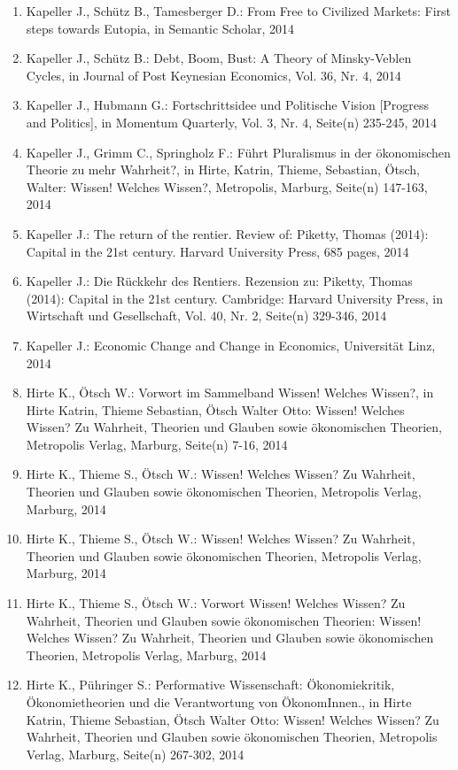 \begin{enumerate}
	 \item Kapeller J., Schütz B., Tamesberger D.: From Free to Civilized Markets: First steps towards Eutopia, in Semantic Scholar, 2014
	 \item Kapeller J., Schütz B.: Debt, Boom, Bust: A Theory of Minsky-Veblen Cycles, in Journal of Post Keynesian Economics, Vol. 36, Nr. 4, 2014
	 \item Kapeller J., Hubmann G.: Fortschrittsidee und Politische Vision [Progress and Politics], in Momentum Quarterly, Vol. 3, Nr. 4, Seite(n) 235-245, 2014
	 \item Kapeller J., Grimm C., Springholz F.: Führt Pluralismus in der ökonomischen Theorie zu mehr Wahrheit?, in Hirte, Katrin, Thieme, Sebastian, Ötsch, Walter: Wissen! Welches Wissen?, Metropolis, Marburg, Seite(n) 147-163, 2014
	 \item Kapeller J.: The return of the rentier. Review of: Piketty, Thomas (2014): Capital in the 21st century. Harvard University Press, 685 pages, 2014
	 \item Kapeller J.: Die Rückkehr des Rentiers. Rezension zu: Piketty, Thomas (2014): Capital in the 21st century. Cambridge: Harvard University Press, in Wirtschaft und Gesellschaft, Vol. 40, Nr. 2, Seite(n) 329-346, 2014
	 \item Kapeller J.: Economic Change and Change in Economics, Universität Linz, 2014
	 \item Hirte K., Ötsch W.: Vorwort im Sammelband \glqq Wissen! Welches Wissen?\grqq{}, in Hirte Katrin, Thieme Sebastian, Ötsch Walter Otto: Wissen! Welches Wissen? Zu Wahrheit, Theorien und Glauben sowie ökonomischen Theorien, Metropolis Verlag, Marburg, Seite(n) 7-16, 2014
	 \item Hirte K., Thieme S., Ötsch W.: Wissen! Welches Wissen? Zu Wahrheit, Theorien und Glauben sowie ökonomischen Theorien, Metropolis Verlag, Marburg, 2014
	 \item Hirte K., Thieme S., Ötsch W.: Wissen! Welches Wissen? Zu Wahrheit, Theorien und Glauben sowie ökonomischen Theorien, Metropolis Verlag, Marburg, 2014
	 \item Hirte K., Thieme S., Ötsch W.: Vorwort Wissen! Welches Wissen? Zu Wahrheit, Theorien und Glauben sowie ökonomischen Theorien: Wissen! Welches Wissen? Zu Wahrheit, Theorien und Glauben sowie ökonomischen Theorien, Metropolis Verlag, Marburg, 2014
	 \item Hirte K., Pühringer S.: Performative Wissenschaft: Ökonomiekritik, Ökonomietheorien und die Verantwortung von ÖkonomInnen., in Hirte Katrin, Thieme Sebastian, Ötsch Walter Otto: Wissen! Welches Wissen? Zu Wahrheit, Theorien und Glauben sowie ökonomischen Theorien, Metropolis Verlag, Marburg, Seite(n) 267-302, 2014

\end{enumerate}
